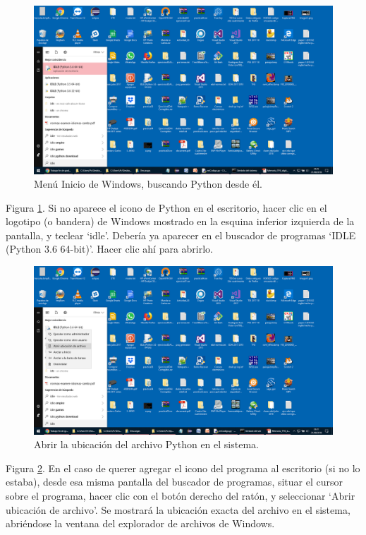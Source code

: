 \begin{figure}[h!]
  	\centering
	\includegraphics[width=\textwidth]{CapturasInstalacionPython/unnamed(8).png}
	\caption{Menú Inicio de Windows, buscando Python desde él.
	\label{fig:CapturasInstalacionPython/unnamed(8).png}}
\end{figure}

Figura \ref{fig:CapturasInstalacionPython/unnamed(8).png}. Si no aparece el icono de Python en el escritorio, hacer clic en el logotipo (o bandera) de Windows mostrado en la esquina inferior izquierda de la pantalla, y teclear ‘idle’. Debería ya aparecer en el buscador de programas ‘IDLE (Python 3.6 64-bit)’. Hacer clic ahí para abrirlo.

\begin{figure}[h!]
  	\centering
	\includegraphics[width=\textwidth]{CapturasInstalacionPython/unnamed(9).png}
	\caption{Abrir la ubicación del archivo Python en el sistema.
	\label{fig:CapturasInstalacionPython/unnamed(9).png}}
\end{figure}

Figura \ref{fig:CapturasInstalacionPython/unnamed(9).png}. En el caso de querer agregar el icono del programa al escritorio (si no lo estaba), desde esa misma pantalla del buscador de programas, situar el cursor sobre el programa, hacer clic con el botón derecho del ratón, y seleccionar ‘Abrir ubicación de archivo’. Se mostrará la ubicación exacta del archivo en el sistema, abriéndose la ventana del explorador de archivos de Windows.

